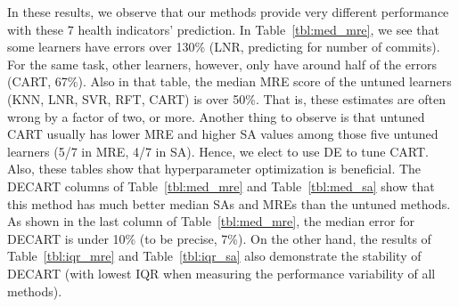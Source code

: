 \documentclass[sigconf,review,anonymous]{acmart}
\begin{document}
In these results, we observe that our methods provide very different performance with these 7 health indicators' prediction. In Table~\ref{tbl:med_mre}, we see that some learners have errors over 130\% (LNR, predicting for number of commits). For the same task, other learners, however, only have around half of the errors (CART, 67\%).
Also in that   table, the median MRE score of the untuned learners (KNN, LNR, SVR, RFT, CART) is over 50\%. That is,  these estimates are often wrong by a factor of two, or more.
Another thing to observe is that untuned CART usually has lower MRE and higher SA values among those five untuned learners (5/7 in MRE, 4/7 in SA). Hence, we elect to use DE to tune CART. 
Also, these tables show that   hyperparameter optimization is   beneficial.
The  DECART columns of Table~\ref{tbl:med_mre} and Table~\ref{tbl:med_sa} show that this method has much better median SAs and MREs than the untuned methods. As shown in the last column of Table~\ref{tbl:med_mre}, the median error for DECART is under 10\% (to be precise, 7\%). On the other hand, the results of Table~\ref{tbl:iqr_mre} and Table~\ref{tbl:iqr_sa} also demonstrate the stability of DECART (with lowest IQR when measuring the performance variability of all methods).

\end{document}
